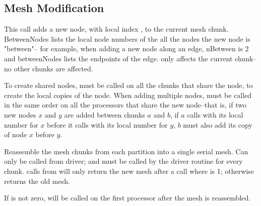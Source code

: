 \documentclass[10pt]{article}
\begin{document}
\subsection{Mesh Modification}


This call adds a new node, with local index , to the current mesh chunk. 
BetweenNodes lists the local node numbers of the all the nodes the new node is 
"between"-- for example, when adding a new node along an edge, nBetween is 2
and betweenNodes lists the endpoints of the edge.
 only affects the current chunk-- no other chunks are affected.

To create shared nodes,  must be called on all the chunks that 
share the node, to create the local copies of the node.
When adding multiple nodes,  must be called in the same order 
on all the processors that share the new node--that is, if two new
nodes $x$ and $y$ are added between chunks $a$ and $b$, if $a$ calls
 with its local number for $x$ before it calls 
with its local number for $y$, $b$ must also add its copy of node $x$ before $y$.



Reassemble the mesh chunks from each partition into a single serial mesh.
Can only be called from driver; and must be called by the driver routine for
every chunk.  calls from
 will only return the new mesh after a  call
where  is 1; otherwise  returns the old mesh.

If  is not zero, 
will be called on the first processor after the mesh is reassembled.

\end{document}
